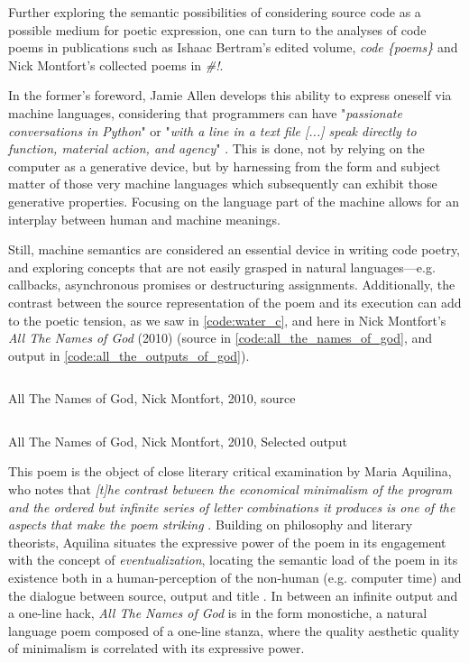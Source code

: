 Further exploring the semantic possibilities of considering source code as a possible medium for poetic expression, one can turn to the analyses of code poems in publications such as Ishaac Bertram's edited volume, \emph{code \{poems\}} and Nick Montfort's collected poems in \emph{\#!}.

In the former's foreword, Jamie Allen develops this ability to express oneself via machine languages, considering that programmers can have "\emph{passionate conversations in Python}" or "\emph{with a line in a text file [...] speak directly to function, material action, and agency}" \citep{bertram_code_2012}. This is done, not by relying on the computer as a generative device, but by harnessing from the form and subject matter of those very machine languages which subsequently can exhibit those generative properties. Focusing on the language part of the machine allows for an interplay between human and machine meanings.

Still, machine semantics are considered an essential device in writing code poetry, and exploring concepts that are not easily grasped in natural languages—e.g. callbacks, asynchronous promises or destructuring assignments. Additionally, the contrast between the source representation of the poem and its execution can add to the poetic tension, as we saw in \ref{code:water_c}, and here in Nick Montfort's \emph{All The Names of God} (2010) (source in \ref{code:all_the_names_of_god}, and output in \ref{code:all_the_outputs_of_god}).

\begin{listing}
  \inputminted{perl}{./corpus/all_the_names_of_god.pl}
  \caption{All The Names of God, Nick Montfort, 2010, source}
  \label{code:all_the_names_of_god}
\end{listing}

\begin{listing}
  \inputminted{text}{./corpus/all_the_names_of_god.txt}
  \caption{All The Names of God, Nick Montfort, 2010, Selected output}
  \label{code:all_the_outputs_of_god}
\end{listing}

This poem is the object of close literary critical examination by Maria Aquilina, who notes that \emph{[t]he contrast between the economical minimalism of the program and the ordered but infinite series of letter combinations it produces is one of the aspects that make the poem striking} \citep{aquilina_computational_2015}. Building on philosophy and literary theorists, Aquilina situates the expressive power of the poem in its engagement with the concept of \emph{eventualization}, locating the semantic load of the poem in its existence both in a human-perception of the non-human (e.g. computer time) and the dialogue between source, output and title \citep{aquilina_computational_2015}. In between an infinite output and a one-line hack, \emph{All The Names of God} is in the form monostiche, a natural language poem composed of a one-line stanza, where the quality aesthetic quality of minimalism is correlated with its expressive power.

